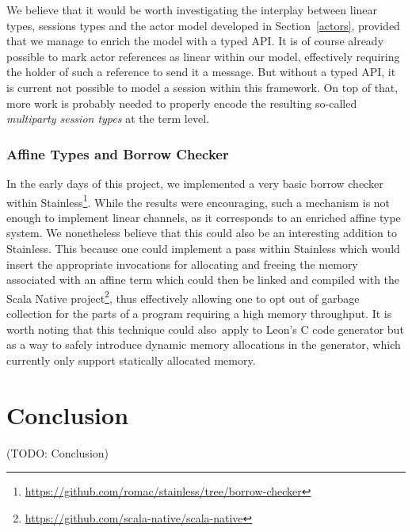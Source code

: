 \documentclass[a4paper,twoside]{article}
\newcommand{\TODO}[1]{\textcolor{YellowOrange}{(TODO: #1)}} %
\newcommand{\RefSec}[1]{Section~\ref{#1}}
\begin{document}
We believe that it would be worth investigating the interplay between linear types, sessions types and the actor model developed in \RefSec{actors}, provided that we manage to enrich the model with a typed API. It is of course already possible to mark actor references as linear within our model, effectively requiring the holder of such a reference to send it a message. But without a typed API, it is current not possible to model a session within this framework. On top of that, more work is probably needed to properly encode the resulting so-called \textit{multiparty session types}\cite{DBLP:journals/corr/NeykovaY16} at the term level.

\subsubsection*{Affine Types and Borrow Checker}

In the early days of this project, we implemented a very basic borrow checker within Stainless\footnote{\url{https://github.com/romac/stainless/tree/borrow-checker}}. While the results were encouraging, such a mechanism is not enough to implement linear channels, as it corresponds to an enriched affine type system. We nonetheless believe that this could also be an interesting addition to Stainless. This because one could implement a pass within Stainless which would insert the appropriate invocations for allocating and freeing the memory associated with an affine term which could then be linked and compiled with the Scala Native project\footnote{\url{https://github.com/scala-native/scala-native}}, thus effectively allowing one to opt out of garbage collection for the parts of a program requiring a high memory throughput. It is worth noting that this technique could also apply to Leon's C code generator \cite{genc1, genc2} but as a way to safely introduce dynamic memory allocations in the generator, which currently only support statically allocated memory.

\clearpage
\section{Conclusion}
\label{conclusion}

\TODO{Conclusion}

\clearpage

\appendix

%

\clearpage



\end{document}
